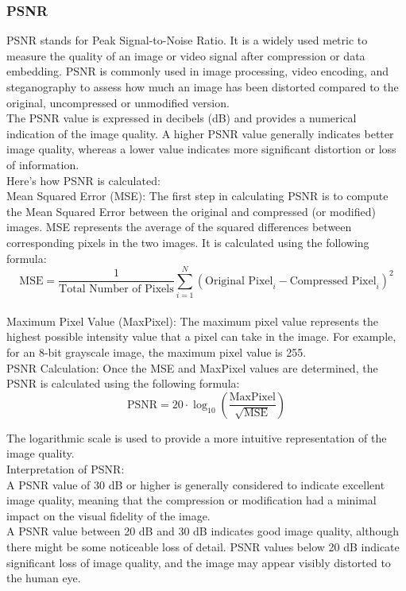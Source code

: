 \documentclass{report}
\begin{document}
\subsubsection{PSNR}
PSNR stands for Peak Signal-to-Noise Ratio. It is a widely used metric to measure the quality of an image or video signal after compression or data embedding. PSNR is commonly used in image processing, video encoding, and steganography to assess how much an image has been distorted compared to the original, uncompressed or unmodified version.\\
The PSNR value is expressed in decibels (dB) and provides a numerical indication of the image quality. A higher PSNR value generally indicates better image quality, whereas a lower value indicates more significant distortion or loss of information.\\
Here's how PSNR is calculated:\\
Mean Squared Error (MSE): The first step in calculating PSNR is to compute the Mean Squared Error between the original and compressed (or modified) images. MSE represents the average of the squared differences between corresponding pixels in the two images. It is calculated using the following formula:\\
\begin{equation*}
    \text{MSE} = \frac{1}{\text{Total Number of Pixels}} \sum_{i=1}^{N} (\text{Original Pixel}_i - \text{Compressed Pixel}_i)^2
\end{equation*}
\\
Maximum Pixel Value (MaxPixel): The maximum pixel value represents the highest possible intensity value that a pixel can take in the image. For example, for an 8-bit grayscale image, the maximum pixel value is 255.\\
PSNR Calculation: Once the MSE and MaxPixel values are determined, the PSNR is calculated using the following formula:
\begin{equation*}
    \text{PSNR} = 20 \cdot \log_{10}\left(\frac{\text{MaxPixel}}{\sqrt{\text{MSE}}}\right)
\end{equation*}

The logarithmic scale is used to provide a more intuitive representation of the image quality.\\
Interpretation of PSNR:\\
A PSNR value of 30 dB or higher is generally considered to indicate excellent image quality, meaning that the compression or modification had a minimal impact on the visual fidelity of the image.\\
A PSNR value between 20 dB and 30 dB indicates good image quality, although there might be some noticeable loss of detail.
PSNR values below 20 dB indicate significant loss of image quality, and the image may appear visibly distorted to the human eye.\\
\end{document}
